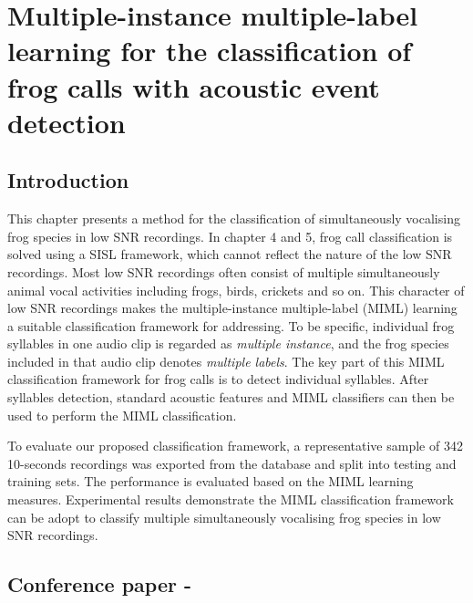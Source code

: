 
\chapter[Multiple-instance multiple-label learning for the classification of frog calls with acoustic event detection]{Multiple-instance multiple-label learning for the classification of frog calls with acoustic event detection}
\label{cha:cha6MIML}


\section{Introduction}
\label{sec:intro}

This chapter presents a method for the classification of simultaneously vocalising frog species in low SNR recordings. In chapter 4 and 5, frog call classification is solved using a SISL framework, which cannot reflect the nature of the low SNR recordings. Most low SNR recordings often 
consist of multiple simultaneously animal vocal activities including frogs, birds, crickets and so on. This character of low SNR recordings makes the multiple-instance multiple-label (MIML) learning a suitable classification framework for addressing. 
To be specific, individual frog syllables in one audio clip is regarded as \textit{multiple instance}, and the frog species included in that audio clip denotes \textit{multiple labels}. 
The key part of this MIML classification framework for frog calls is to detect individual syllables. After syllables detection, standard acoustic features and MIML classifiers can then be used to perform the MIML classification.


To evaluate our proposed classification framework, a representative sample of 342 10-seconds recordings was exported from the database and split into testing and training sets. The performance is evaluated based on the MIML learning measures. Experimental results demonstrate the MIML classification framework can be adopt to classify multiple simultaneously vocalising frog species in low SNR recordings.


\section{Conference paper - }



